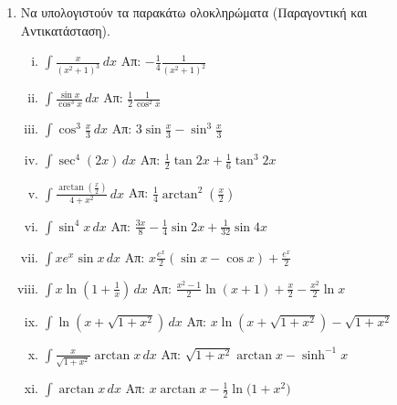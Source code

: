


\everymath{\displaystyle}
\thispagestyle{empty}



\begin{center}
\end{center}

\vspace{\baselineskip}

\begin{enumerate}
	\item Να υπολογιστούν τα παρακάτω ολοκληρώματα (Παραγοντική και
		Αντικατάσταση).

		\begin{enumerate}[i)]
			\item $ \int \frac{x}{(x^{2} + 1)^{3}}  \,{dx} $  \hfill Απ: $ -
				\frac{1}{4} \frac{1}{(x^{2}+1)^{2}} $
			\item $ \int \frac{\sin{x}}{\cos^{3}{x}} \,{dx} $  \hfill Απ: $
				\frac{1}{2} \frac{1}{\cos^{2}{x}} $
			\item $ \int \cos^{3}{\frac{x}{3}} \,{dx} $ \hfill Απ: $ 3
				\sin{\frac{x}{3}} - \sin^{3}{\frac{x}{3}} $
			\item $ \int \sec^{4}(2x) \,{dx}$  \hfill Απ: $ \frac{1}{2} \tan{2x} +
				\frac{1}{6} \tan^{3}{2x}  $\
			\item $ \int \frac{\arctan(\frac{x}{2})}{4+x^{2}} \,{dx} $  \hfill Απ: $ \frac{1}{4}
				\arctan^{2}\left(\frac{x}{2}\right) $
			\item $ \int \sin^{4}x \,{dx} $  \hfill Απ: $ \frac{3x}{8} -
				\frac{1}{4} \sin{2x} + \frac{1}{32} \sin{4x} $
			\item $ \int xe^{x} \sin{x}\,{dx}  $  \hfill Απ: $ x \frac{e^{x}}{2}
				(\sin{x} - \cos{x}) + \frac{e^{x}}{2} $
			\item $ \int x \ln(1 + \frac{1}{x}) \,{dx} $ \hfill Απ: $ \frac{x^{2} - 1}{2}
				\ln{(x+1)} + \frac{x}{2} - \frac{x^{2}}{2} \ln{x} $
			\item $ \int \ln{(x + \sqrt{1+x^{2}})} \,{dx} $ \hfill Απ: $ x \ln{(x +
				\sqrt{1 + x^{2}})} - \sqrt{1 + x^{2}}  $
			\item $ \int \frac{x}{\sqrt{1 + x^{2}}} \arctan x \,{dx} $ \hfill Απ: $
				\sqrt{1 + x^{2}} \arctan x - \sinh^{-1}{x}  $
			\item $ \int \arctan x \,{dx} $ \hfill Απ: $ x \arctan x - \frac{1}{2}
				\ln{(1 + x^{2}})  $
		\end{enumerate}



\end{enumerate}
